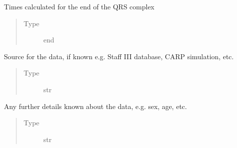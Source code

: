 \documentclass[letterpaper,10pt,english]{sphinxmanual}
\begin{document}
\begin{fulllineitems}
\begin{fulllineitems}
\begin{quote}
\begin{description}
\end{description}\end{quote}

\end{fulllineitems}


\begin{fulllineitems}
\label{\detokenize{_autosummary/signalanalysis.ecg.Ecg:signalanalysis.ecg.Ecg.qrs_end}}
\sphinxAtStartPar
Times calculated for the end of the QRS complex
\begin{quote}\begin{description}
\item[{Type}] \leavevmode
\sphinxAtStartPar
end

\end{description}\end{quote}

\end{fulllineitems}


\begin{fulllineitems}
\label{\detokenize{_autosummary/signalanalysis.ecg.Ecg:signalanalysis.ecg.Ecg.data_source}}
\sphinxAtStartPar
Source for the data, if known e.g. Staff III database, CARP simulation, etc.
\begin{quote}\begin{description}
\item[{Type}] \leavevmode
\sphinxAtStartPar
str

\end{description}\end{quote}

\end{fulllineitems}


\begin{fulllineitems}
\label{\detokenize{_autosummary/signalanalysis.ecg.Ecg:signalanalysis.ecg.Ecg.comments}}
\sphinxAtStartPar
Any further details known about the data, e.g. sex, age, etc.
\begin{quote}\begin{description}
\item[{Type}] \leavevmode
\sphinxAtStartPar
str


\end{description}
\end{quote}
\end{fulllineitems}
\end{fulllineitems}
\end{document}
